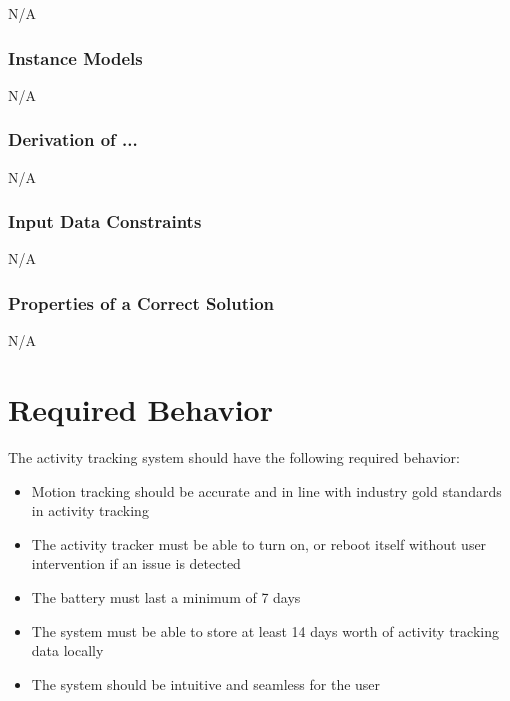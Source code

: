 \documentclass[12pt]{article}
\begin{document}
N/A



\subsubsection{Instance Models} \label{sec_instance}
N/A

\subsubsection*{Derivation of ...}
N/A

\subsubsection{Input Data Constraints} \label{sec_DataConstraints}
N/A


\subsubsection{Properties of a Correct Solution} \label{sec_CorrectSolution}
N/A


\section{Required Behavior}
\label{Req_Behavior}
The activity tracking system should have the following required behavior: \\

\begin{itemize}
\item Motion tracking should be accurate and in line with industry gold standards in activity tracking\\
\item The activity tracker must be able to turn on, or reboot itself without user intervention if an issue is detected\\
\item The battery must last a minimum of 7 days\\
\item The system must be able to store at least 14 days worth of activity tracking data locally\\
\item The system should be intuitive and seamless for the user\\
\end{itemize} 
\end{document}
